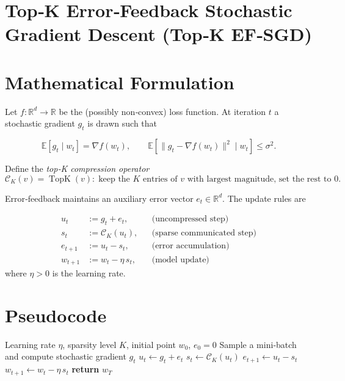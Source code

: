\documentclass{article}
\begin{document}
\section*{Top‑K Error‑Feedback Stochastic Gradient Descent (Top‑K EF‑SGD)}

\section*{Mathematical Formulation}
Let $f:\mathbb{R}^{d}\rightarrow\mathbb{R}$ be the (possibly non‑convex) loss function.  
At iteration $t$ a stochastic gradient $g_{t}$ is drawn such that  

\[
\mathbb{E}[g_{t}\mid w_{t}]=\nabla f(w_{t}),\qquad 
\mathbb{E}\!\left[\|g_{t}-\nabla f(w_{t})\|^{2}\mid w_{t}\right]\le\sigma^{2}.
\]

Define the \emph{top‑K compression operator}
\[
\mathcal{C}_{K}(v)=\operatorname{TopK}(v):\;
\text{keep the $K$ entries of $v$ with largest magnitude,
set the rest to $0$}.
\]

Error‑feedback maintains an auxiliary error vector $e_{t}\in\mathbb{R}^{d}$.
The update rules are  

\[
\begin{aligned}
u_{t}      &:= g_{t}+e_{t},                                 &&\text{(uncompressed step)}\\[4pt]
s_{t}      &:= \mathcal{C}_{K}(u_{t}),                     &&\text{(sparse communicated step)}\\[4pt]
e_{t+1}    &:= u_{t}-s_{t},                                 &&\text{(error accumulation)}\\[4pt]
w_{t+1}    &:= w_{t}-\eta\,s_{t},                           &&\text{(model update)} 
\end{aligned}
\]
where $\eta>0$ is the learning rate.  

\section*{Pseudocode}
\begin{algorithm}[H]
\caption{Top‑K EF‑SGD}
\begin{algorithmic}[1]
\Require Learning rate $\eta$, sparsity level $K$, initial point $w_{0}$, $e_{0}=0$
    \State Sample a mini‑batch and compute stochastic gradient $g_{t}$  
    \State $u_{t}\gets g_{t}+e_{t}$ 
    \State $s_{t}\gets \mathcal{C}_{K}(u_{t})$ 
    \State $e_{t+1}\gets u_{t}-s_{t}$ 
    \State $w_{t+1}\gets w_{t}-\eta\,s_{t}$ 
\EndFor
\State \textbf{return} $w_{T}$
\end{algorithmic}
\end{algorithm}
\end{document}
